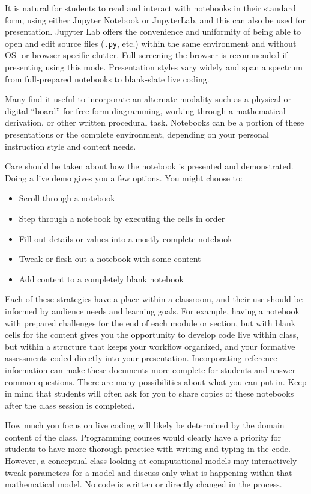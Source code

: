 \documentclass[]{book}
\providecommand{\tightlist}{%
  \setlength{\itemsep}{0pt}\setlength{\parskip}{0pt}}
\begin{document}
It is natural for students to read and interact with notebooks in their
standard form, using either Jupyter Notebook or JupyterLab, and this can
also be used for presentation. Jupyter Lab offers the convenience and
uniformity of being able to open and edit source files (\texttt{.py},
etc.) within the same environment and without OS- or browser-specific
clutter. Full screening the browser is recommended if presenting using
this mode. Presentation styles vary widely and span a spectrum from
full-prepared notebooks to blank-slate live coding.

Many find it useful to incorporate an alternate modality such as a
physical or digital ``board'' for free-form diagramming, working through
a mathematical derivation, or other written procedural task. Notebooks
can be a portion of these presentations or the complete environment,
depending on your personal instruction style and content needs.

Care should be taken about how the notebook is presented and
demonstrated. Doing a live demo gives you a few options. You might
choose to:

\begin{itemize}
\tightlist
\item
  Scroll through a notebook
\item
  Step through a notebook by executing the cells in order
\item
  Fill out details or values into a mostly complete notebook
\item
  Tweak or flesh out a notebook with some content
\item
  Add content to a completely blank notebook
\end{itemize}

Each of these strategies have a place within a classroom, and their use
should be informed by audience needs and learning goals. For example,
having a notebook with prepared challenges for the end of each module or
section, but with blank cells for the content gives you the opportunity
to develop code live within class, but within a structure that keeps
your workflow organized, and your formative assessments coded directly
into your presentation. Incorporating reference information can make
these documents more complete for students and answer common questions.
There are many possibilities about what you can put in. Keep in mind
that students will often ask for you to share copies of these notebooks
after the class session is completed.

How much you focus on live coding will likely be determined by the
domain content of the class. Programming courses would clearly have a
priority for students to have more thorough practice with writing and
typing in the code. However, a conceptual class looking at computational
models may interactively tweak parameters for a model and discuss only
what is happening within that mathematical model. No code is written or
directly changed in the process.
\end{document}
